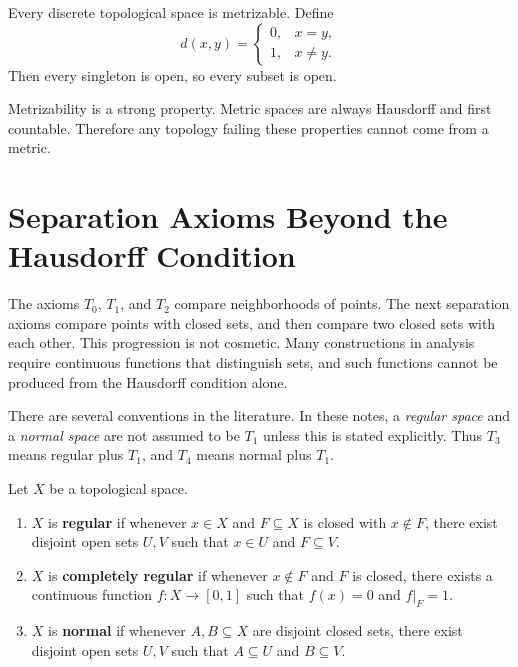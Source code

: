 \begin{example}
Every discrete topological space is metrizable. Define
\[
    d(x,y)=
    \begin{cases}
    0,&x=y,\\
    1,&x\neq y.
    \end{cases}
\]
Then every singleton is open, so every subset is open.
\end{example}

\begin{remark}
Metrizability is a strong property. Metric spaces are always Hausdorff and first countable. Therefore any topology failing these properties cannot come from a metric.
\end{remark}


\section{Separation Axioms Beyond the Hausdorff Condition}

The axioms $T_0$, $T_1$, and $T_2$ compare neighborhoods of points. The next separation axioms compare points with closed sets, and then compare two closed sets with each other. This progression is not cosmetic. Many constructions in analysis require continuous functions that distinguish sets, and such functions cannot be produced from the Hausdorff condition alone.

There are several conventions in the literature. In these notes, a \emph{regular space} and a \emph{normal space} are not assumed to be $T_1$ unless this is stated explicitly. Thus $T_3$ means regular plus $T_1$, and $T_4$ means normal plus $T_1$.

\begin{definition}
Let $X$ be a topological space.
\begin{enumerate}
    \item $X$ is \textbf{regular} if whenever $x\in X$ and $F\subseteq X$ is closed with $x\notin F$, there exist disjoint open sets $U,V$ such that $x\in U$ and $F\subseteq V$.
    \item $X$ is \textbf{completely regular} if whenever $x\notin F$ and $F$ is closed, there exists a continuous function $f:X\to[0,1]$ such that $f(x)=0$ and $f|_F=1$.
    \item $X$ is \textbf{normal} if whenever $A,B\subseteq X$ are disjoint closed sets, there exist disjoint open sets $U,V$ such that $A\subseteq U$ and $B\subseteq V$.
\end{enumerate}
\end{definition}

